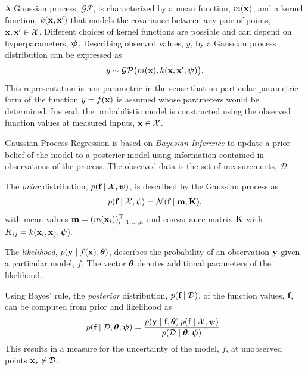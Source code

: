 A Gaussian process, $\mathcal{GP}$, is characterized by a mean function, $m(\textbf{x})$, and a kernel function, $k(\textbf{x},\textbf{x}')$ that models the covariance between any pair of points, $\textbf{x}, \textbf{x}' \in \mathcal{X}$. Different choices of kernel functions are possible and can depend on hyperparameters, $\boldsymbol{\psi}$. Describing observed values, $y$, by a Gaussian process distribution can be expressed as
\begin{equation*}
  \begin{array}{lll}
    y \sim \mathcal{GP}\big(m(\textbf{x}), k(\textbf{x},\textbf{x}',\boldsymbol{\psi})\big).
  \end{array}
\end{equation*}
This representation is non-parametric in the sense that no particular parametric form of the function $y=f(\textbf{x})$ is assumed whose parameters would be determined. Instead, the probabilistic model is constructed using the observed function values at measured inputs, $\textbf{x} \in \mathcal{X}$.

Gaussian Process Regression is based on \emph{Bayesian Inference} to update a prior belief of the model to a posterier model using information contained in observations of the process.
The observed data is the set of measurements, $\mathcal{D}$. 

The \emph{prior} distribution, $p(\textbf{f}\mid\mathcal{X},\boldsymbol{\psi})$, is described by the Gaussian process as 
\begin{equation*}
  \begin{array}{lll}
    p(\textbf{f}\mid\mathcal{X},\psi) = \mathcal{N}(\textbf{f}\mid\textbf{m},\textbf{K}),
  \end{array}
\end{equation*}
with mean values $\textbf{m} = (m(\textbf{x}_i))^\top_{i=1,\dots,n}$ and convariance matrix $\textbf{K}$ with $K_{ij} = k(\textbf{x}_i,\textbf{x}_j,\boldsymbol{\psi}).$

The \emph{likelihood}, $p(\textbf{y}\mid f(\textbf{x}), \boldsymbol{\theta})$, describes the probability of an observation $\textbf{y}$ given a particular model, $f$. The vector $\boldsymbol{\theta}$ denotes additional parameters of the likelihood. 

Using Bayes' rule, the \emph{posterior} distribution, $p(\textbf{f}\mid\mathcal{D})$, of the function values, $\textbf{f}$, can be computed from prior and likelihood as
\begin{equation*}
  \begin{array}{lll}
    p(\textbf{f}\mid\mathcal{D},\boldsymbol{\theta},\boldsymbol{\psi}) 
      = \displaystyle\frac{\displaystyle{p(\textbf{y}\mid\textbf{f},\boldsymbol{\theta})\,p(\textbf{f}\mid\mathcal{X},\boldsymbol{\psi})}}{\displaystyle{p(\mathcal{D}\mid\boldsymbol{\theta},\boldsymbol{\psi})}}\,.
  \end{array}
\end{equation*}
This results in a measure for the uncertainty of the model, $f$, at unobserved points $\textbf{x}_\ast \notin \mathcal{D}$. 

